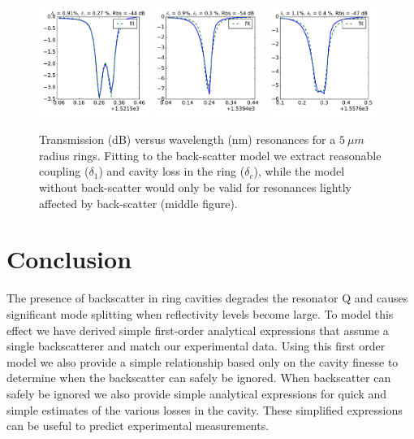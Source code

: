 \documentclass[10pt]{article}
\begin{document}
\begin{figure}[htbp]
\includegraphics[width=0.32\textwidth]{figures/bs1521.pdf}
\includegraphics[width=0.32\textwidth]{figures/bs1539.pdf}
\includegraphics[width=0.32\textwidth]{figures/bs1557.pdf}

\caption{Transmission (dB) versus wavelength (nm) resonances for a $5~\mu m$ radius rings.
Fitting to the back-scatter model  we extract reasonable coupling ($\delta_1$) and cavity loss in the ring ($\delta_c$), while the model without back-scatter would only be valid for resonances lightly affected by back-scatter (middle figure).}
\label{fig:bs_measurements}
\end{figure}


\section{Conclusion}
The presence of backscatter in ring cavities degrades the resonator Q and causes significant mode splitting when reflectivity levels become large.   To model this effect we have derived simple first-order analytical expressions that assume a single backscatterer and match our experimental data. Using this first order model we also provide a simple relationship based only on the cavity finesse to determine when the backscatter can safely be ignored.  When backscatter can safely be  ignored we also provide simple analytical expressions for quick and simple estimates of the various losses in the cavity.  These simplified expressions can be useful to predict experimental measurements.  
\end{document}
